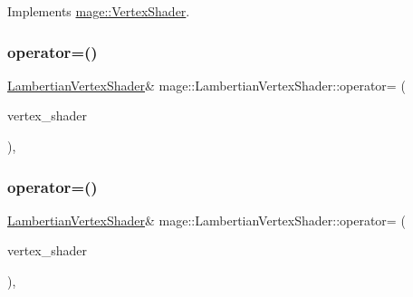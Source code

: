 Implements \hyperlink{classmage_1_1_vertex_shader_acb1c9f6671a7f5f92cdadf2d2a12d43a}{mage\+::\+Vertex\+Shader}.

\hypertarget{classmage_1_1_lambertian_vertex_shader_a974b43346ab5d8081d9101f715e7670d}{}\label{classmage_1_1_lambertian_vertex_shader_a974b43346ab5d8081d9101f715e7670d} 
\subsubsection{\texorpdfstring{operator=()}{operator=()}\hspace{0.1cm}{\footnotesize\ttfamily [1/2]}}
{\footnotesize\ttfamily \hyperlink{classmage_1_1_lambertian_vertex_shader}{Lambertian\+Vertex\+Shader}\& mage\+::\+Lambertian\+Vertex\+Shader\+::operator= (\begin{DoxyParamCaption}\item[{const \hyperlink{classmage_1_1_lambertian_vertex_shader}{Lambertian\+Vertex\+Shader} \&}]{vertex\+\_\+shader }\end{DoxyParamCaption})\hspace{0.3cm}{\ttfamily [private]}, {\ttfamily [delete]}}

\hypertarget{classmage_1_1_lambertian_vertex_shader_ae0a53e712856923403c1f7542941df6e}{}\label{classmage_1_1_lambertian_vertex_shader_ae0a53e712856923403c1f7542941df6e} 
\subsubsection{\texorpdfstring{operator=()}{operator=()}\hspace{0.1cm}{\footnotesize\ttfamily [2/2]}}
{\footnotesize\ttfamily \hyperlink{classmage_1_1_lambertian_vertex_shader}{Lambertian\+Vertex\+Shader}\& mage\+::\+Lambertian\+Vertex\+Shader\+::operator= (\begin{DoxyParamCaption}\item[{\hyperlink{classmage_1_1_lambertian_vertex_shader}{Lambertian\+Vertex\+Shader} \&\&}]{vertex\+\_\+shader }\end{DoxyParamCaption})\hspace{0.3cm}{\ttfamily [private]}, {\ttfamily [delete]}}



